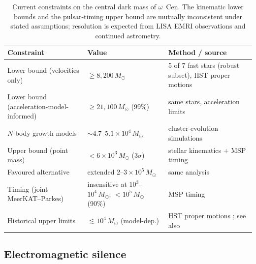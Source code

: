 \documentclass[11pt]{article}
\newcommand{\msun}{\ensuremath{M_\odot}}
\begin{document}
\begin{table}[tbp]
\centering
\caption{Current constraints on the central dark mass of $\omega$~Cen. The kinematic lower bounds and the pulsar-timing upper bound are mutually inconsistent under stated assumptions; resolution is expected from LISA EMRI observations and continued astrometry.}
\label{tab:mass}
\small
\begin{tabular}{p{4.1cm}p{3.4cm}p{6.2cm}}
\toprule
Constraint & Value & Method / source \\
\midrule
Lower bound (velocities only) & $\geq 8{,}200\,\msun$ & 5 of 7 fast stars (robust subset), HST proper motions \citep{Haberle2024Nature} \\
Lower bound (acceleration-model-informed) & $\geq 21{,}100\,\msun$ (99\%) & same stars, acceleration limits \citep{Haberle2024Nature} \\
$N$-body growth models & $\sim 4.7$--$5.1\times10^{4}\,\msun$ & cluster-evolution simulations \citep{GonzalezPrieto2025} \\
Upper bound (point mass) & $< 6\times10^{3}\,\msun$ ($3\sigma$) & stellar kinematics + MSP timing \citep{BanaresHernandez2025} \\
Favoured alternative & extended $2$--$3\times10^{5}\,\msun$ & same analysis \citep{BanaresHernandez2025} \\
Timing (joint MeerKAT--Parkes) & insensitive at $10^{3}$--$10^{4}\,\msun$; $< 10^{5}\,\msun$ (90\%) & MSP timing \citep{ColomiBernadich2026} \\
Historical upper limits & $\lesssim 10^{4}\,\msun$ (model-dep.) & HST proper motions \citep{vanderMarelAnderson2010}; see also \citet{Zocchi2019} \\
\bottomrule
\end{tabular}
\end{table}

\subsection{Electromagnetic silence}
\label{sec:silence}
\end{document}
